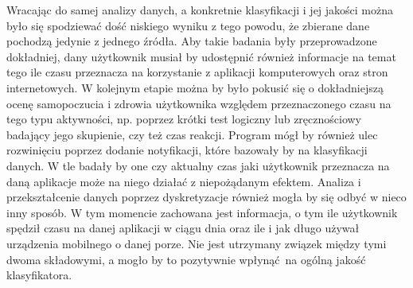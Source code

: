 \documentclass[a4paper,twoside,12pt]{book}
\begin{document}
Wracając do samej analizy danych, a konkretnie klasyfikacji i jej jakości można było się spodziewać dość niskiego wyniku z tego powodu, że zbierane dane pochodzą jedynie z jednego źródła. Aby takie badania były przeprowadzone dokładniej, dany użytkownik musiał by udostępnić również informacje na temat tego ile czasu przeznacza na korzystanie z aplikacji komputerowych oraz stron internetowych. W kolejnym etapie można by było pokusić się o dokładniejszą ocenę samopoczucia i zdrowia użytkownika względem przeznaczonego czasu na tego typu aktywności, np. poprzez krótki test logiczny lub zręcznościowy badający jego skupienie, czy też czas reakcji. Program mógł by również ulec rozwinięciu poprzez dodanie notyfikacji, które bazowały by na klasyfikacji danych. W tle badały by one czy aktualny czas jaki użytkownik przeznacza na daną aplikacje może na niego działać z niepożądanym efektem. Analiza i przekształcenie danych poprzez dyskretyzacje również mogła by się odbyć w nieco inny sposób. W tym momencie zachowana jest informacja, o tym ile  użytkownik spędził czasu na danej aplikacji w ciągu dnia oraz ile i jak długo używał urządzenia mobilnego o danej porze. Nie jest utrzymany związek między tymi dwoma składowymi, a mogło by to pozytywnie wpłynąć na ogólną jakość klasyfikatora. 
\end{document}
